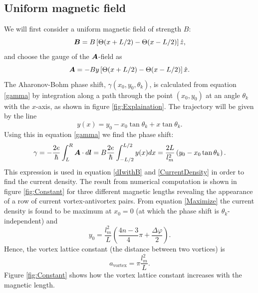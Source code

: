 \subsection{Uniform magnetic field}
\label{sec:ConstField}
We will first consider a uniform magnetic field of strength $B$:
\begin{equation}
    \boldsymbol{B} = B\left[\Theta(x+L/2) - \Theta(x-L/2) \right]\hat{z},
\end{equation}
and choose the gauge of the $\boldsymbol{A}$-field as
\begin{equation}
    \boldsymbol{A} = -By\left[\Theta(x+L/2) - \Theta(x-L/2) \right]\hat{x}.
\end{equation}
The Aharonov-Bohm phase shift, $\gamma(x_0,y_0,\theta_k)$, is calculated from equation \eqref{gamma} by integration along a path through the point $(x_0,y_0)$ at an angle $\theta_k$ with the $x$-axis, as shown in figure \ref{fig:Explaination}. The trajectory will be given by the line
\begin{equation}
    y(x) = y_0-x_0\tan\theta_k + x\tan\theta_k.
    \label{trajectory}
\end{equation}
Using this in equation \eqref{gamma} we find the phase shift:
\begin{equation}
    \gamma = -\frac{2e}{\hbar}\int_L^R \boldsymbol{A}\cdot d\boldsymbol{l} = B\frac{2e}{\hbar}\int_{-L/2}^{L/2}y(x)dx = \frac{2L}{l_m^2}\left(y_0 - x_0\tan\theta_k \right).
\label{gamma1}
\end{equation}
This expression is used in equation \eqref{dIwithB} and \eqref{CurrentDensity} in order to find the current density. The result from numerical computation is shown in figure \ref{fig:Constant} for three different magnetic lengths revealing the appearance of a row of current vortex-antivortex pairs. From equation \eqref{Maximize} the current density is found to be maximum at $x_0=0$ (at which the phase shift is $\theta_k$-independent) and
\begin{equation}
    y_0 = \frac{l_m^2}{L}\left(\frac{4n-3}{4}\pi + \frac{\Delta \varphi}{2}\right).
\end{equation}
Hence, the vortex lattice constant (the distance between two vortices) is
\begin{equation}
    a_{\mathrm{vortex}} = \pi\frac{l_m^2}{L}.
\end{equation}
Figure \ref{fig:Constant} shows how the vortex lattice constant increases with the magnetic length. 
